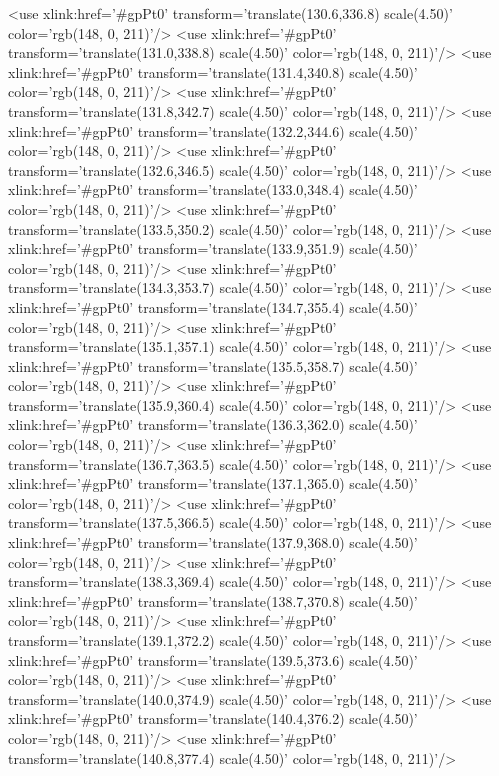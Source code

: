 	<use xlink:href='#gpPt0' transform='translate(130.6,336.8) scale(4.50)' color='rgb(148,   0, 211)'/>
	<use xlink:href='#gpPt0' transform='translate(131.0,338.8) scale(4.50)' color='rgb(148,   0, 211)'/>
	<use xlink:href='#gpPt0' transform='translate(131.4,340.8) scale(4.50)' color='rgb(148,   0, 211)'/>
	<use xlink:href='#gpPt0' transform='translate(131.8,342.7) scale(4.50)' color='rgb(148,   0, 211)'/>
	<use xlink:href='#gpPt0' transform='translate(132.2,344.6) scale(4.50)' color='rgb(148,   0, 211)'/>
	<use xlink:href='#gpPt0' transform='translate(132.6,346.5) scale(4.50)' color='rgb(148,   0, 211)'/>
	<use xlink:href='#gpPt0' transform='translate(133.0,348.4) scale(4.50)' color='rgb(148,   0, 211)'/>
	<use xlink:href='#gpPt0' transform='translate(133.5,350.2) scale(4.50)' color='rgb(148,   0, 211)'/>
	<use xlink:href='#gpPt0' transform='translate(133.9,351.9) scale(4.50)' color='rgb(148,   0, 211)'/>
	<use xlink:href='#gpPt0' transform='translate(134.3,353.7) scale(4.50)' color='rgb(148,   0, 211)'/>
	<use xlink:href='#gpPt0' transform='translate(134.7,355.4) scale(4.50)' color='rgb(148,   0, 211)'/>
	<use xlink:href='#gpPt0' transform='translate(135.1,357.1) scale(4.50)' color='rgb(148,   0, 211)'/>
	<use xlink:href='#gpPt0' transform='translate(135.5,358.7) scale(4.50)' color='rgb(148,   0, 211)'/>
	<use xlink:href='#gpPt0' transform='translate(135.9,360.4) scale(4.50)' color='rgb(148,   0, 211)'/>
	<use xlink:href='#gpPt0' transform='translate(136.3,362.0) scale(4.50)' color='rgb(148,   0, 211)'/>
	<use xlink:href='#gpPt0' transform='translate(136.7,363.5) scale(4.50)' color='rgb(148,   0, 211)'/>
	<use xlink:href='#gpPt0' transform='translate(137.1,365.0) scale(4.50)' color='rgb(148,   0, 211)'/>
	<use xlink:href='#gpPt0' transform='translate(137.5,366.5) scale(4.50)' color='rgb(148,   0, 211)'/>
	<use xlink:href='#gpPt0' transform='translate(137.9,368.0) scale(4.50)' color='rgb(148,   0, 211)'/>
	<use xlink:href='#gpPt0' transform='translate(138.3,369.4) scale(4.50)' color='rgb(148,   0, 211)'/>
	<use xlink:href='#gpPt0' transform='translate(138.7,370.8) scale(4.50)' color='rgb(148,   0, 211)'/>
	<use xlink:href='#gpPt0' transform='translate(139.1,372.2) scale(4.50)' color='rgb(148,   0, 211)'/>
	<use xlink:href='#gpPt0' transform='translate(139.5,373.6) scale(4.50)' color='rgb(148,   0, 211)'/>
	<use xlink:href='#gpPt0' transform='translate(140.0,374.9) scale(4.50)' color='rgb(148,   0, 211)'/>
	<use xlink:href='#gpPt0' transform='translate(140.4,376.2) scale(4.50)' color='rgb(148,   0, 211)'/>
	<use xlink:href='#gpPt0' transform='translate(140.8,377.4) scale(4.50)' color='rgb(148,   0, 211)'/>
